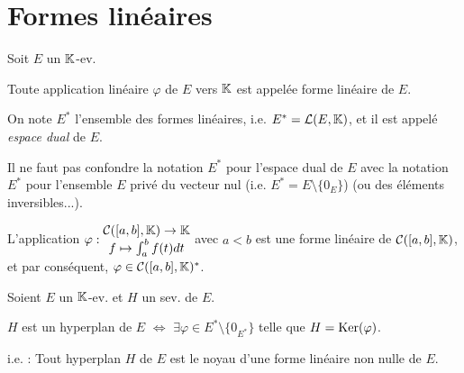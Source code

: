 \documentclass[12pt, a4paper]{report}
\begin{document}
\chapter{Formes linéaires}

\begin{definition}
    Soit $E$ un $\mathbb{K}$-ev.

    Toute application linéaire $\varphi$ de $E$ vers $\mathbb{K}$ est appelée forme linéaire de $E$.

    On note $E^*$ l'ensemble des formes linéaires, i.e. $E^* = \mathcal L(E,\mathbb{K})$, et il est appelé \textit{espace dual} de $E$.
\end{definition}

\begin{attention}
    Il ne faut pas confondre la notation $E^*$ pour l'espace dual de $E$ avec la notation $E^*$ pour l'ensemble $E$ privé du vecteur nul (i.e. $E^* = E \setminus \{0_E\}$) (ou des éléments inversibles...).
\end{attention}

\begin{example}
    L'application $\varphi : \begin{matrix}
    \mathcal C([a,b],\mathbb{K}) \to \mathbb{K}\\
    f \mapsto \int_a^b f(t) dt
    \end{matrix}$ avec $a < b$ est une forme linéaire de $\mathcal C([a,b],\mathbb{K})$, et par conséquent, $\varphi \in \mathcal C([a,b],\mathbb{K})^*$.
\end{example}

\begin{property}
    Soient $E$ un $\mathbb{K}$-ev. et $H$ un sev. de $E$.

    $H$ est un hyperplan de $E$ $\iff$ $\exists \varphi \in E^* \setminus \{0_{E^*}\}$ telle que $H = \mathrm{Ker}(\varphi)$.
    
    i.e. : Tout hyperplan $H$ de $E$ est le noyau d'une forme linéaire non nulle de $E$.
\end{property}

\end{document}

